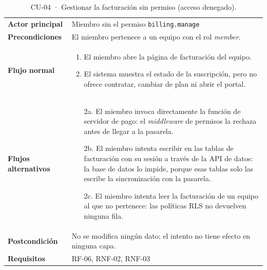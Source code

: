 {\footnotesize
\begin{xltabular}{\textwidth}{@{}>{\bfseries}p{2.6cm}X@{}}
  \caption{CU-04 · Gestionar la facturación sin permiso (acceso denegado).}\label{tab:ana-cu04}\\
    \toprule
    Actor principal & Miembro sin el permiso \texttt{billing.manage} \\
    Precondiciones & El miembro pertenece a un equipo con el rol \textit{member}. \\
    \midrule
    Flujo normal &
      \begin{enumerate}[nosep,leftmargin=*]
        \item El miembro abre la página de facturación del equipo.
        \item El sistema muestra el estado de la suscripción, pero no ofrece contratar, cambiar de plan ni abrir el portal.
      \end{enumerate} \\
    \midrule
    Flujos alternativos &
      \begin{itemize}[nosep,leftmargin=*]
        \item[2a.] El miembro invoca directamente la función de servidor de pago: el \textit{middleware} de permisos la rechaza antes de llegar a la pasarela.
        \item[2b.] El miembro intenta escribir en las tablas de facturación con su sesión a través de la API de datos: la base de datos lo impide, porque esas tablas solo las escribe la sincronización con la pasarela.
        \item[2c.] El miembro intenta leer la facturación de un equipo al que no pertenece: las políticas RLS no devuelven ninguna fila.
      \end{itemize} \\
    \midrule
    Postcondición & No se modifica ningún dato; el intento no tiene efecto en ninguna capa. \\
    Requisitos & RF-06, RNF-02, RNF-03 \\
    \bottomrule
\end{xltabular}}

